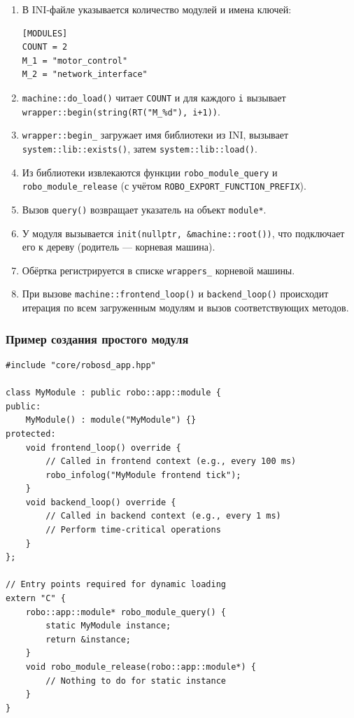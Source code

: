 \documentclass[a4paper,12pt]{article}
\begin{document}
\begin{enumerate}
    \item В INI-файле указывается количество модулей и имена ключей:
\begin{verbatim}
[MODULES]
COUNT = 2
M_1 = "motor_control"
M_2 = "network_interface"
\end{verbatim}
    \item \texttt{machine::do\_load()} читает \texttt{COUNT} и для каждого \texttt{i} вызывает \texttt{wrapper::begin(string(RT("M\_\%d"), i+1))}.
    \item \texttt{wrapper::begin\_} загружает имя библиотеки из INI, вызывает \texttt{system::lib::exists()}, затем \texttt{system::lib::load()}.
    \item Из библиотеки извлекаются функции \texttt{robo\_module\_query} и \texttt{robo\_module\_release} (с учётом \texttt{ROBO\_EXPORT\_FUNCTION\_PREFIX}).
    \item Вызов \texttt{query()} возвращает указатель на объект \texttt{module*}.
    \item У модуля вызывается \texttt{init(nullptr, \&machine::root())}, что подключает его к дереву (родитель — корневая машина).
    \item Обёртка регистрируется в списке \texttt{wrappers\_} корневой машины.
    \item При вызове \texttt{machine::frontend\_loop()} и \texttt{backend\_loop()} происходит итерация по всем загруженным модулям и вызов соответствующих методов.
\end{enumerate}

\subsubsection{Пример создания простого модуля}

\begin{lstlisting}[caption={Пример модуля}]
#include "core/robosd_app.hpp"

class MyModule : public robo::app::module {
public:
    MyModule() : module("MyModule") {}
protected:
    void frontend_loop() override {
        // Called in frontend context (e.g., every 100 ms)
        robo_infolog("MyModule frontend tick");
    }
    void backend_loop() override {
        // Called in backend context (e.g., every 1 ms)
        // Perform time-critical operations
    }
};

// Entry points required for dynamic loading
extern "C" {
    robo::app::module* robo_module_query() {
        static MyModule instance;
        return &instance;
    }
    void robo_module_release(robo::app::module*) {
        // Nothing to do for static instance
    }
}
\end{lstlisting}
\end{document}

